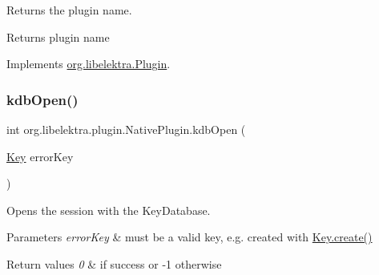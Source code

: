 Returns the plugin name. 

\begin{DoxyReturn}{Returns}
plugin name 
\end{DoxyReturn}


Implements \hyperlink{interfaceorg_1_1libelektra_1_1Plugin_a51be1d6efdd3542c2ae503031bd16e04}{org.\+libelektra.\+Plugin}.

\mbox{\label{classorg_1_1libelektra_1_1plugin_1_1NativePlugin_a232c37208b79734c6be8a9f426efa56a}} 
\subsubsection{\texorpdfstring{kdb\+Open()}{kdbOpen()}}
{\footnotesize\ttfamily int org.\+libelektra.\+plugin.\+Native\+Plugin.\+kdb\+Open (\begin{DoxyParamCaption}\item[{\hyperlink{classorg_1_1libelektra_1_1Key}{Key}}]{error\+Key }\end{DoxyParamCaption})\hspace{0.3cm}{\ttfamily [inline]}}



Opens the session with the Key\+Database. 


\begin{DoxyParams}{Parameters}
{\em error\+Key} & must be a valid key, e.\+g. created with \hyperlink{classorg_1_1libelektra_1_1Key_af407cf43625618af4e7fb2576037fcfc}{Key.\+create()} \\
\hline
\end{DoxyParams}

\begin{DoxyRetVals}{Return values}
{\em 0} & if success or -\/1 otherwise \\
\hline
\end{DoxyRetVals}
\mbox{\label{classorg_1_1libelektra_1_1plugin_1_1NativePlugin_a81510de92e0d65784e877bf53b89756a}} 
